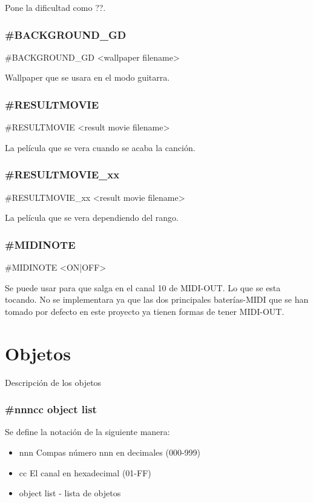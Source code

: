 \documentclass[a4paper,11pt,oneside]{book}
\begin{document}
Pone la dificultad como ??. 


\subsubsection{\#BACKGROUND\_GD}
\#BACKGROUND\_GD <wallpaper filename>

Wallpaper que se usara en el modo guitarra.


\subsubsection{\#RESULTMOVIE}
\#RESULTMOVIE <result movie filename>

La película que se vera cuando se acaba la canción. 

\subsubsection{\#RESULTMOVIE\_xx}
\#RESULTMOVIE\_xx <result movie filename>

La película que se vera dependiendo del rango.


\subsubsection{\#MIDINOTE}
\#MIDINOTE <ON|OFF>

Se puede usar para que salga en el canal 10 de MIDI-OUT. Lo que se esta tocando. No se implementara ya que las dos principales baterías-MIDI que se han tomado por defecto en este proyecto ya tienen formas de tener MIDI-OUT.

\section{Objetos}
Descripción de los objetos


\subsubsection{\#nnncc object list}
Se define la notación de la siguiente manera:

\begin{itemize}
  \item nnn Compas número nnn en decimales (000-999)
  \item cc El canal en hexadecimal (01-FF)
  \item object list - lista de objetos
\end{itemize}
\end{document}
